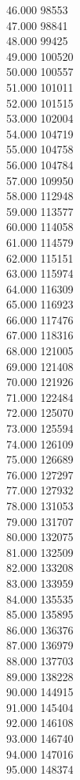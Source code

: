 { 46.000	98553 \\
 47.000	98841 \\
 48.000	99425 \\
 49.000	100520 \\
 50.000	100557 \\
 51.000	101011 \\
 52.000	101515 \\
 53.000	102004 \\
 54.000	104719 \\
 55.000	104758 \\
 56.000	104784 \\
 57.000	109950 \\
 58.000	112948 \\
 59.000	113577 \\
 60.000	114058 \\
 61.000	114579 \\
 62.000	115151 \\
 63.000	115974 \\
 64.000	116309 \\
 65.000	116923 \\
 66.000	117476 \\
 67.000	118316 \\
 68.000	121005 \\
 69.000	121408 \\
 70.000	121926 \\
 71.000	122484 \\
 72.000	125070 \\
 73.000	125594 \\
 74.000	126109 \\
 75.000	126689 \\
 76.000	127297 \\
 77.000	127932 \\
 78.000	131053 \\
 79.000	131707 \\
 80.000	132075 \\
 81.000	132509 \\
 82.000	133208 \\
 83.000	133959 \\
 84.000	135535 \\
 85.000	135895 \\
 86.000	136376 \\
 87.000	136979 \\
 88.000	137703 \\
 89.000	138228 \\
 90.000	144915 \\
 91.000	145404 \\
 92.000	146108 \\
 93.000	146740 \\
 94.000	147016 \\
 95.000	148374 \\
}
